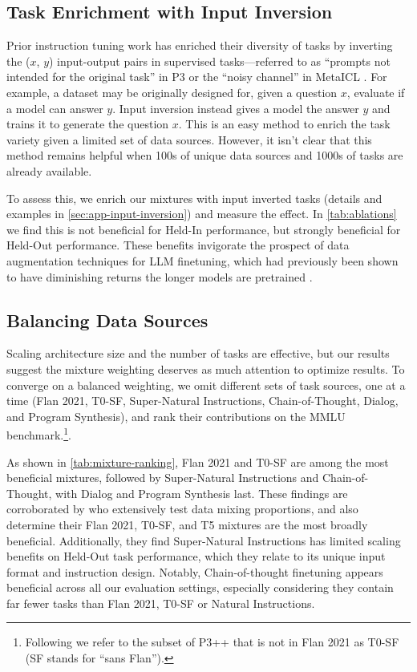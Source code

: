\subsection{Task Enrichment with Input Inversion}
\label{sec:mtft-input-inversion}

Prior instruction tuning work has enriched their diversity of tasks by inverting the ($x$, $y$) input-output pairs in supervised tasks---referred to as ``prompts not intended for the original task'' in P3 \citep{bach-etal-2022-promptsource} or the ``noisy channel'' in MetaICL \citep{min-etal-2022-metaicl}. For example, a dataset may be originally designed for, given a question $x$, evaluate if a model can answer $y$. Input inversion instead gives a model the answer $y$ and trains it to generate the question $x$. This is an easy method to enrich the task variety given a limited set of data sources. However, it isn't clear that this method remains helpful when 100s of unique data sources and 1000s of tasks are already available.

To assess this, we enrich our mixtures with input inverted tasks (details and examples in \ref{sec:app-input-inversion}) and measure the effect. In \ref{tab:ablations} we find this is not beneficial for Held-In performance, but strongly beneficial for Held-Out performance. These benefits invigorate the prospect of data augmentation techniques for LLM finetuning, which had previously been shown to have diminishing returns the longer models are pretrained \citep{longpre2020effective}.

\subsection{Balancing Data Sources}
\label{sec:mtft-mix-balance}

Scaling architecture size and the number of tasks are effective, but our results suggest the mixture weighting deserves as much attention to optimize results. To converge on a balanced weighting, we omit different sets of task sources, one at a time (Flan 2021, T0-SF, Super-Natural Instructions, Chain-of-Thought, Dialog, and Program Synthesis), and rank their contributions on the MMLU benchmark.\footnote{Following \citet{chung2022scaling} we refer to the subset of P3++ that is not in Flan 2021 as T0-SF (SF stands for “sans Flan”).}.

As shown in \ref{tab:mixture-ranking}, Flan 2021 and T0-SF are among the most beneficial mixtures, followed by Super-Natural Instructions and Chain-of-Thought, with Dialog and Program Synthesis last. These findings are corroborated by \citet{iyer2022optiml} who extensively test data mixing proportions, and also determine their Flan 2021, T0-SF, and T5 mixtures are the most broadly beneficial. Additionally, they find Super-Natural Instructions has limited scaling benefits on Held-Out task performance, which they relate to its unique input format and instruction design. Notably, Chain-of-thought finetuning appears beneficial across all our evaluation settings, especially considering they contain far fewer tasks than Flan 2021, T0-SF or Natural Instructions.

